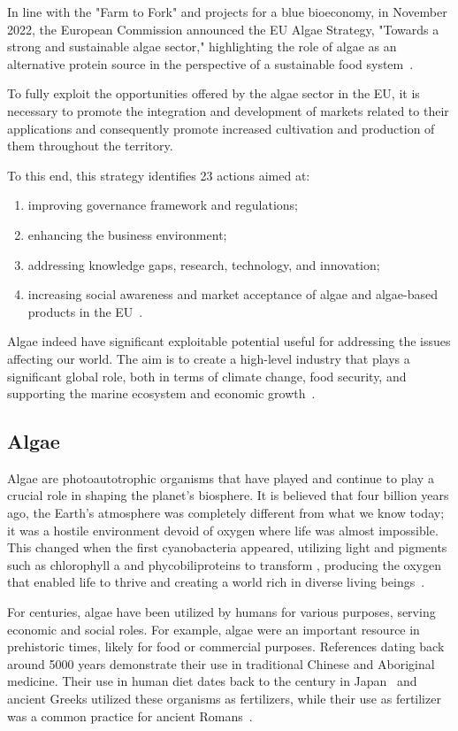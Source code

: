 In line with the "Farm to Fork" and projects for a blue bioeconomy, in November 2022, the European Commission announced the EU Algae Strategy, "Towards a strong and sustainable algae sector," highlighting the role of algae as an alternative protein source in the perspective of a sustainable food system~\parencite{blue_bioeconomy}.

To fully exploit the opportunities offered by the algae sector in the EU, it is necessary to promote the integration and development of markets related to their applications and consequently promote increased cultivation and production of them throughout the territory.

To this end, this strategy identifies 23 actions aimed at:
\begin{enumerate}
\item improving governance framework and regulations;
\item enhancing the business environment;
\item addressing knowledge gaps, research, technology, and innovation;
\item increasing social awareness and market acceptance of algae and algae-based products in the EU~\parencite{kuech_future_2023}.
\end{enumerate}

Algae indeed have significant exploitable potential useful for addressing the issues affecting our world. The aim is to create a high-level industry that plays a significant global role, both in terms of climate change, food security, and supporting the marine ecosystem and economic growth~\parencite{seaweed_manifesto}.

\subsection{Algae}
Algae are photoautotrophic organisms that have played and continue to play a crucial role in shaping the planet's biosphere. It is believed that four billion years ago, the Earth's atmosphere was completely different from what we know today; it was a hostile environment devoid of oxygen where life was almost impossible. This changed when the first cyanobacteria appeared, utilizing light and pigments such as chlorophyll a and phycobiliproteins to transform , producing the oxygen that enabled life to thrive and creating a world rich in diverse living beings~\parencite{mayfield_algae_2021}.

For centuries, algae have been utilized by humans for various purposes, serving economic and social roles. For example, algae were an important resource in prehistoric times, likely for food or commercial purposes. References dating back around \num{5000} years demonstrate their use in traditional Chinese and Aboriginal medicine. Their use in human diet dates back to the  century in Japan~\parencite{jacquin_Selected_2014} and ancient Greeks utilized these organisms as fertilizers, while their use as fertilizer was a common practice for ancient Romans~\parencite{jacquin_Selected_2014}.

